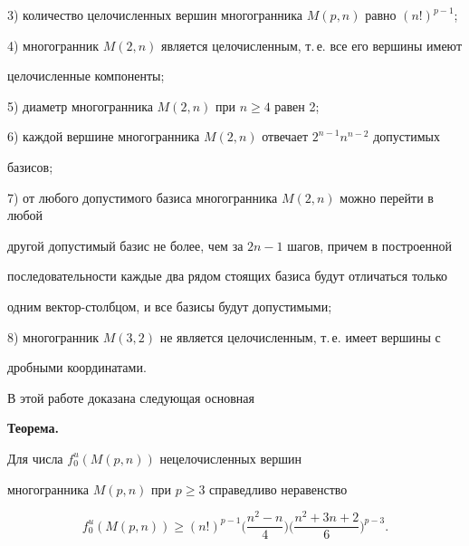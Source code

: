 3) количество целочисленных вершин многогранника $M(p,n)$ равно $(n!)^{p-1}$;





4) многогранник $M(2,n)$ является целочисленным, т.\,е. все его вершины имеют


целочисленные компоненты;





5) диаметр многогранника $M(2,n)$ при $n\geq 4$ равен 2;





6) каждой вершине многогранника $M(2,n)$ отвечает $2^{n-1}n^{n-2}$ допустимых


базисов;





7) от любого допустимого базиса многогранника $M(2,n)$ можно перейти в любой


другой допустимый базис не более, чем за $2n-1$ шагов, причем в построенной


последовательности каждые два рядом стоящих базиса будут отличаться только


одним вектор-столбцом, и все базисы будут допустимыми;





8) многогранник $M(3,2)$ не является целочисленным, т.\,е. имеет вершины с


дробными координатами.





В этой работе доказана следующая основная


\medskip





{\bf Теорема.} {\it


Для числа $f^u_0(M(p,n))$ нецелочисленных вершин


многогранника $M(p,n)$ при $p\geq 3$ справедливо неравенство


}


\begin{equation}


f^u_0(M(p,n))\geq (n!)^{p-1}\bigg(\frac{n^2-n}{4}\bigg)


\bigg(\frac{n^2+3n+2}{6}\bigg)^{p-3}.


\end{equation}





